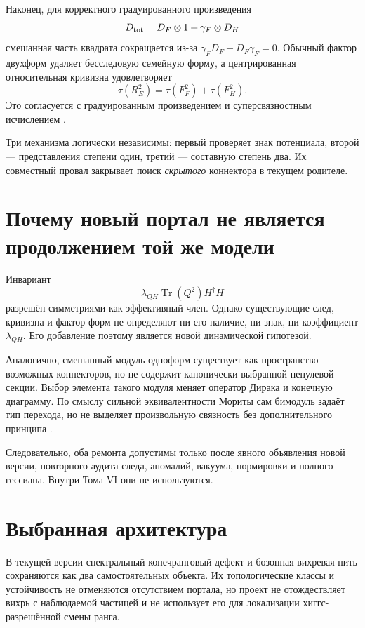 Наконец, для корректного градуированного произведения
\begin{equation}
 D_{\rm tot}=D_F\otimes1+\gamma_F\otimes D_H
\end{equation}
смешанная часть квадрата сокращается из-за
$\gamma_FD_F+D_F\gamma_F=0$. Обычный фактор двухформ удаляет
бесследовую семейную форму, а центрированная относительная кривизна
удовлетворяет
\begin{equation}
 \tau(R_E^2)=\tau(F_F^2)+\tau(F_H^2).
\end{equation}
Это согласуется с градуированным произведением и суперсвязностным
исчислением \cite{quillen1985,kucerovsky1997}.

Три механизма логически независимы: первый проверяет знак потенциала,
второй --- представления степени один, третий --- составную степень два.
Их совместный провал закрывает поиск \emph{скрытого} коннектора в
текущем родителе.

\section{Почему новый портал не является продолжением той же модели}

Инвариант
\begin{equation}
 \lambda_{QH}\operatorname{Tr}(Q^2)H^\dagger H
\end{equation}
разрешён симметриями как эффективный член. Однако существующие след,
кривизна и фактор форм не определяют ни его наличие, ни знак, ни
коэффициент $\lambda_{QH}$. Его добавление поэтому является новой
динамической гипотезой.

Аналогично, смешанный модуль одноформ существует как пространство
возможных коннекторов, но не содержит канонически выбранной ненулевой
секции. Выбор элемента такого модуля меняет оператор Дирака и конечную
диаграмму. По смыслу сильной эквивалентности Мориты сам бимодуль задаёт
тип перехода, но не выделяет произвольную связность без дополнительного
принципа \cite{brown-green-rieffel1977}.

Следовательно, оба ремонта допустимы только после явного объявления новой
версии, повторного аудита следа, аномалий, вакуума, нормировки и полного
гессиана. Внутри Тома VI они не используются.

\section{Выбранная архитектура}

\begin{theorem}
В текущей версии спектральный конечранговый дефект и бозонная вихревая
нить сохраняются как два самостоятельных объекта. Их топологические
классы и устойчивость не отменяются отсутствием портала, но проект не
отождествляет вихрь с наблюдаемой частицей и не использует его для
локализации хиггс-разрешённой смены ранга.
\end{theorem}

